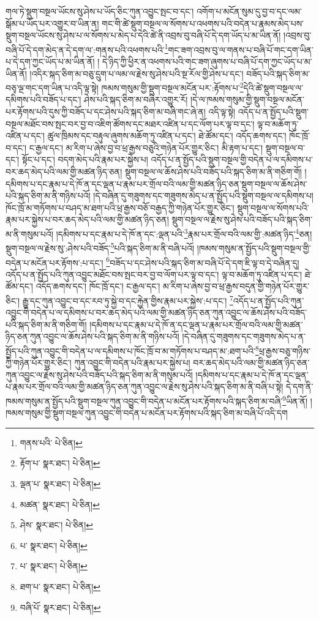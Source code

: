 གལ་ཏེ་སྡུག་བསྔལ་ཡོངས་སུ་ཤེས་པ་ཡོད་ཅིང་ཀུན་འབྱུང་སྤང་བ་དང་། འགོག་པ་མངོན་སུམ་དུ་བྱ་བ་དང་ལམ་སྒོམ་པ་ཡོད་པར་འགྱུར་བ་ཡིན་ན། གང་གི་ཚེ་སྡུག་བསྔལ་ལ་སོགས་པ་འཕགས་པའི་བདེན་པ་རྣམས་མེད་པས་སྡུག་བསྔལ་ཡོངས་སུ་ཤེས་པ་ལ་སོགས་པ་མེད་པ་དེའི་ཚེ་ནི་འབྲས་བུ་བཞི་པོ་དེ་དག་ཡོད་པ་མ་ཡིན་ནོ། །འབྲས་བུ་བཞི་པོ་དེ་དག་མེད་ན་དེ་དག་ལ་:གནས་པའི་འཕགས་པའི་\footnote{གནས་པའི་  པེ་ཅིན། }གང་ཟག་འབྲས་བུ་ལ་གནས་པ་བཞི་པོ་གང་དག་ཡིན་པ་དེ་དག་ཀྱང་ཡོད་པ་མ་ཡིན་ནོ། །
དེ་ཉིད་ཀྱི་ཕྱིར་ན་འཕགས་པའི་གང་ཟག་ཞུགས་པ་བཞི་པོ་དག་ཀྱང་ཡོད་པ་མ་ཡིན་ནོ། །འདིར་སྐད་ཅིག་མ་བཅུ་དྲུག་པ་ལམ་ལ་རྗེས་སུ་ཤེས་པའི་སྔ་རོལ་གྱི་ཤེས་པ་དང་། བཟོད་པའི་སྐད་ཅིག་མ་བཅྭ་ལྔ་གང་དག་ཡིན་པ་འདི་ལྟ་སྟེ། ཁམས་གསུམ་གྱི་སྡུག་བསྔལ་མངོན་པར་:རྟོགས་པ་\footnote{རྟོག་པ་  སྣར་ཐང་།  པེ་ཅིན། }དེའི་ཚེ་སྡུག་བསྔལ་ལ་དམིགས་པའི་བཟོད་པ་དང་། ཤེས་པའི་སྐད་ཅིག་མ་བཞིར་འགྱུར་རོ། །དེ་ལ་ཁམས་གསུམ་གྱི་སྡུག་བསྔལ་མངོན་པར་རྟོགས་པའི་དུས་ཀྱི་བཟོད་པ་དང་ཤེས་པའི་སྐད་ཅིག་མ་བཞི་གང་ཞེ་ན། འདི་ལྟ་སྟེ། འདོད་པ་ན་སྤྱོད་པའི་སྡུག་བསྔལ་མཐོང་བས་སྤང་བར་བྱ་བ་འཇིག་ཚོགས་དང་མཐར་འཛིན་པ་དང་ལོག་པར་ལྟ་བ་དང་། ལྟ་བ་མཆོག་ཏུ་འཛིན་པ་དང་། ཚུལ་ཁྲིམས་དང་བརྟུལ་ཞུགས་མཆོག་ཏུ་འཛིན་པ་དང་། ཐེ་ཚོམ་དང་། འདོད་ཆགས་དང་། ཁོང་ཁྲོ་བ་དང་། ང་རྒྱལ་དང་། མ་རིག་པ་ཞེས་བྱ་བ་ཕྲ་རྒྱས་བཅུའི་གཉེན་པོར་གྱུར་ཅིང་། མི་རྟག་པ་དང་། སྡུག་བསྔལ་བ་དང་། སྟོང་པ་དང་། བདག་མེད་པའི་རྣམ་པར་སྐྱེས་པ། འདོད་པ་ན་སྤྱོད་པའི་སྡུག་བསྔལ་གྱི་བདེན་པ་ལ་དམིགས་པ་བར་ཆད་མེད་པའི་ལམ་གྱི་མཚན་ཉིད་ཅན། སྡུག་བསྔལ་ལ་ཆོས་ཤེས་པའི་བཟོད་པའི་སྐད་ཅིག་མ་ནི་གཅིག་གོ། །དམིགས་པ་དང་རྣམ་པ་དེ་ཁོ་ན་དང་ལྡན་པ་རྣམ་པར་གྲོལ་བའི་ལམ་གྱི་མཚན་ཉིད་ཅན་སྡུག་བསྔལ་ལ་ཆོས་ཤེས་པའི་སྐད་ཅིག་མ་ནི་གཉིས་པའོ། །དེ་བཞིན་དུ་གཟུགས་དང་གཟུགས་མེད་པ་ན་སྤྱོད་པའི་སྡུག་བསྔལ་ལ་དམིགས་པ། ཁོང་ཁྲོ་མ་གཏོགས་པ་བཤད་མ་ཐག་པའི་ཕྲ་རྒྱས་བཅོ་བརྒྱད་ཀྱི་གཉེན་པོར་གྱུར་ཅིང་། སྡུག་བསྔལ་ལ་སོགས་པའི་རྣམ་པར་སྐྱེས་པ་བར་ཆད་མེད་པའི་ལམ་གྱི་མཚན་ཉིད་ཅན། སྡུག་བསྔལ་ལ་རྗེས་སུ་ཤེས་པའི་བཟོད་པའི་སྐད་ཅིག་མ་ནི་གསུམ་པའོ། །དམིགས་པ་དང་རྣམ་པ་དེ་ཁོ་ན་དང་:ལྡན་པའི་\footnote{ལྡན་པ་  སྣར་ཐང་།  པེ་ཅིན། }རྣམ་པར་གྲོལ་བའི་ལམ་གྱི་:མཚན་ཉིད་\footnote{མཚན་  སྣར་ཐང་།  པེ་ཅིན། }ཅན། སྡུག་བསྔལ་ལ་རྗེས་སུ་:ཤེས་པའི་བཟོད་\footnote{ཤེས་  སྣར་ཐང་།  པེ་ཅིན། }པའི་སྐད་ཅིག་མ་ནི་བཞི་པའོ། །ཁམས་གསུམ་ན་སྤྱོད་པའི་སྡུག་བསྔལ་གྱི་བདེན་པ་མངོན་པར་རྟོགས་:པ་དང་། \footnote{པ་  སྣར་ཐང་།  པེ་ཅིན། }བཟོད་པ་དང་ཤེས་པའི་སྐད་ཅིག་མ་བཞི་པོ་དེ་དག་ཇི་ལྟ་བ་དེ་བཞིན་དུ། འདོད་པ་ན་སྤྱོད་པའི་ཀུན་འབྱུང་མཐོང་བས་སྤང་བར་བྱ་བ་ལོག་པར་ལྟ་བ་དང་། ལྟ་བ་མཆོག་ཏུ་འཛིན་པ་དང་། ཐེ་ཚོམ་དང་། འདོད་ཆགས་དང་། ཁོང་ཁྲོ་དང་། ང་རྒྱལ་དང་། མ་རིག་པ་ཞེས་བྱ་བ་ཕྲ་རྒྱས་བདུན་གྱི་གཉེན་པོར་གྱུར་ཅིང་། རྒྱུ་དང་ཀུན་འབྱུང་བ་དང་རབ་ཏུ་སྐྱེ་བ་དང་རྐྱེན་གྱིས་རྣམ་པར་སྐྱེས་:པ་དང་། \footnote{པ་  སྣར་ཐང་།  པེ་ཅིན། }འདོད་པ་ན་སྤྱོད་པའི་ཀུན་འབྱུང་གི་བདེན་པ་ལ་དམིགས་པ་བར་ཆད་མེད་པའི་ལམ་གྱི་མཚན་ཉིད་ཅན་ཀུན་འབྱུང་ལ་ཆོས་ཤེས་པའི་བཟོད་པའི་སྐད་ཅིག་མ་ནི་གཅིག་གོ། །དམིགས་པ་དང་རྣམ་པ་དེ་ཁོ་ན་དང་ལྡན་པ་རྣམ་པར་གྲོལ་བའི་ལམ་གྱི་མཚན་ཉིད་ཅན་ཀུན་འབྱུང་ལ་ཆོས་ཤེས་པའི་སྐད་ཅིག་མ་ནི་གཉིས་པའོ། །དེ་བཞིན་དུ་གཟུགས་དང་གཟུགས་མེད་པ་ན་སྤྱོད་པའི་ཀུན་འབྱུང་གི་བདེན་པ་ལ་དམིགས་པ་ཁོང་ཁྲོ་བ་མ་གཏོགས་པ་བཤད་མ་:ཐག་པའི་\footnote{ཐག་པ་  སྣར་ཐང་།  པེ་ཅིན། }ཕྲ་རྒྱས་བཅུ་གཉིས་ཀྱི་གཉེན་པོར་གྱུར་ཅིང་། ཀུན་འབྱུང་གི་བདེན་པའི་རྣམ་པར་སྐྱེས་པ། བར་ཆད་མེད་པའི་ལམ་གྱི་མཚན་ཉིད་ཅན་ཀུན་འབྱུང་ལ་རྗེས་སུ་ཤེས་པའི་བཟོད་པའི་སྐད་ཅིག་མ་ནི་གསུམ་པའོ། །དམིགས་པ་དང་རྣམ་པ་དེ་ཁོ་ན་དང་ལྡན་པ་རྣམ་པར་གྲོལ་བའི་ལམ་གྱི་མཚན་ཉིད་ཅན་ཀུན་འབྱུང་ལ་རྗེས་སུ་ཤེས་པའི་སྐད་ཅིག་མ་ནི་བཞི་པ་སྟེ། དེ་དག་ནི་ཁམས་གསུམ་ན་སྤྱོད་པའི་སྡུག་བསྔལ་ཀུན་འབྱུང་གི་བདེན་པ་མངོན་པར་རྟོགས་པའི་སྐད་ཅིག་མ་བཞི་\footnote{བཞི་པོ་  སྣར་ཐང་།  པེ་ཅིན། }ཡིན་ནོ། །ཁམས་གསུམ་གྱི་སྡུག་བསྔལ་ཀུན་འབྱུང་གི་བདེན་པ་མངོན་པར་རྟོགས་པའི་སྐད་ཅིག་མ་བཞི་པོ་འདི་དག 